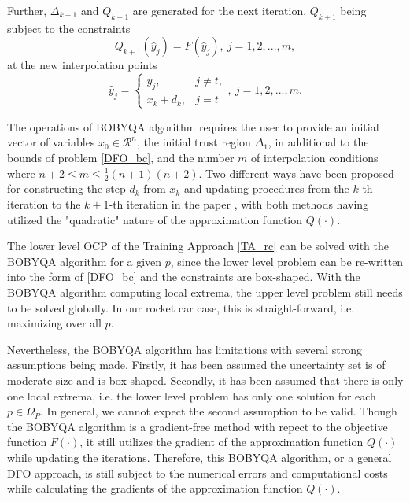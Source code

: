 Further, $\Delta_{k+1}$ and $Q_{k+1}$ are generated for the next iteration, $Q_{k+1}$ being subject to the constraints 
\begin{equation}
	Q_{k+1}(\hat{y}_j)= F(\hat{y}_j), \  j = 1, 2, ..., m, 
\end{equation}
at the new interpolation points
\begin{equation}
	\hat{y}_j =
	\begin{cases}
		y_j, & j \neq t, \\
		x_k+d_k  , & j =t 
	\end{cases},  \  j = 1, 2, ..., m.
\end{equation}

The operations of BOBYQA algorithm requires the user to provide an initial vector of variables $x_0 \in \mathcal{R}^n$, the initial trust region $\Delta_1$, in additional to the bounds of problem \ref{DFO_bc},  and the number $m$ of interpolation conditions where $n+2 \leq m \leq \frac{1}{2}(n+1)(n+2)$. Two different ways have been proposed for constructing the step $d_k$ from $x_k$ and updating procedures from the $k$-th iteration to the $k+1$-th iteration in the paper \cite{MicPow09}, with both methods having utilized the "quadratic" nature of the approximation function $Q(\cdot)$.

The lower level OCP of the Training Approach \ref{TA_rc} can be solved with the BOBYQA algorithm for a given $p$, since the lower level problem can be re-written into the form of \ref{DFO_bc} and the constraints are box-shaped. With the BOBYQA algorithm computing local extrema, the upper level problem still needs to be solved globally. In our rocket car case, this is straight-forward, i.e. maximizing over all $p$. 

Nevertheless, the BOBYQA algorithm has limitations with several strong assumptions being made. Firstly, it has been assumed the uncertainty set is of moderate size and is box-shaped. Secondly, it has been assumed that there is only one local extrema, i.e. the lower level problem has only one solution for each $p \in \Omega_P$. In general, we cannot expect the second assumption to be valid. Though the BOBYQA algorithm is a gradient-free method with repect to the objective function $F(\cdot)$, it still utilizes the gradient of the approximation function $Q(\cdot)$ while updating the iterations. Therefore, this BOBYQA algorithm, or a general DFO approach, is still subject to the numerical errors and computational costs while calculating the gradients of the approximation function $Q(\cdot)$.  

